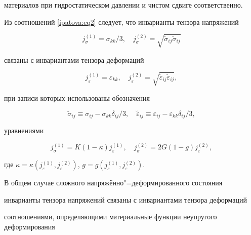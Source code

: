 материалов при гидростатическом давлении и чистом сдвиге соответственно.



Из соотношений \eqref{ipatova:eq2} следует, что инварианты тензора напряжений

\begin{equation}

\label{ipatova:eq3}

j_\sigma^{( 1)} =\sigma_{kk}/3, \quad j_\sigma^{(2)} = \sqrt{\breve{\sigma}_{ij}\breve{\sigma}_{ij} }

\end{equation}

связаны с инвариантами тензора деформаций

\begin{equation}

\label{ipatova:eq5}

j_\varepsilon^{( 1)} =\varepsilon _{kk}, \quad j_\varepsilon^{( 2 )} =\sqrt{\breve{\varepsilon}_{ij}

\breve{\varepsilon}_{ij}},

\end{equation}

при записи которых использованы обозначения

\begin{equation}

\label{ipatova:eq5}

\breve{\sigma}_{ij} \equiv \sigma_{ij} -\sigma _{kk} \delta _{ij}/3, \quad \breve{\varepsilon}_{ij} \equiv \varepsilon_{ij}

-\varepsilon _{kk}\delta _{ij}/3,

\end{equation}

уравнениями

\[

j_\sigma^{( 1 )} =K(1-\kappa)j_\varepsilon^{(1)}, \quad j_\sigma^{(2)} =2G(1-g)j_\varepsilon^{(2)},

\]

где $\kappa =\kappa ( j_\varepsilon^{(1)},j_\varepsilon^{(2)})$, $g=g( j_\varepsilon^{(1)},j_\varepsilon^{(2)})$.



В общем случае сложного напряжённо"=деформированного состояния

инварианты тензора напряжений связаны с инвариантами тензора деформаций

соотношениями, определяющими материальные функции неупругого деформирования

